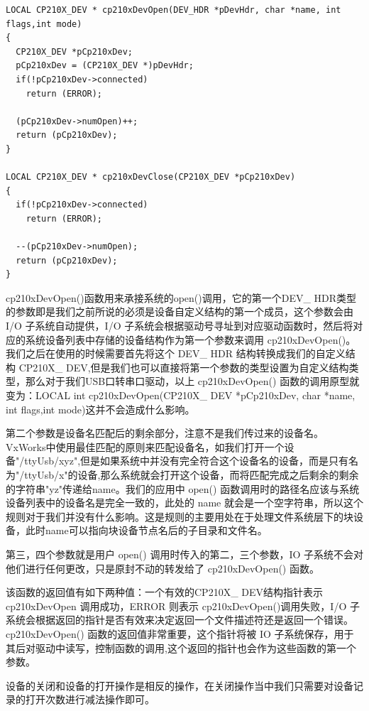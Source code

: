 \lstset{language=C}
\begin{lstlisting}
LOCAL CP210X_DEV * cp210xDevOpen(DEV_HDR *pDevHdr, char *name, int flags,int mode)
{
  CP210X_DEV *pCp210xDev;
  pCp210xDev = (CP210X_DEV *)pDevHdr;
  if(!pCp210xDev->connected)
    return (ERROR);
	
  (pCp210xDev->numOpen)++;
  return (pCp210xDev);
}

LOCAL CP210X_DEV * cp210xDevClose(CP210X_DEV *pCp210xDev)
{
  if(!pCp210xDev->connected)	
    return (ERROR);
	
  --(pCp210xDev->numOpen);
  return (pCp210xDev);
}

\end{lstlisting}

	cp210xDevOpen()函数用来承接系统的open()调用，它的第一个DEV\_ HDR类型的参数即是我们之前所说的必须是设备自定义结构的第一个成员，这个参数会由 I/O 子系统自动提供，I/O 子系统会根据驱动号寻址到对应驱动函数时，然后将对应的系统设备列表中存储的设备结构作为第一个参数来调用 cp210xDevOpen()。我们之后在使用的时候需要首先将这个 DEV\_ HDR 结构转换成我们的自定义结构 CP210X\_ DEV,但是我们也可以直接将第一个参数的类型设置为自定义结构类型，那么对于我们USB口转串口驱动，以上  cp210xDevOpen() 函数的调用原型就变为：LOCAL int cp210xDevOpen(CP210X\_ DEV *pCp210xDev, char *name, int flags,int mode)这并不会造成什么影响。
		
	第二个参数是设备名匹配后的剩余部分，注意不是我们传过来的设备名。VxWorks中使用最佳匹配的原则来匹配设备名，如我们打开一个设备"/ttyUsb/xyz",但是如果系统中并没有完全符合这个设备名的设备，而是只有名为"/ttyUsb/x"的设备,那么系统就会打开这个设备，而将匹配完成之后剩余的剩余的字符串"yz"传递给name。我们的应用中 open() 函数调用时的路径名应该与系统设备列表中的设备名是完全一致的，此处的 name 就会是一个空字符串，所以这个规则对于我们并没有什么影响。这是规则的主要用处在于处理文件系统层下的块设备，此时name可以指向块设备节点名后的子目录和文件名。

	第三，四个参数就是用户 open() 调用时传入的第二，三个参数，IO 子系统不会对他们进行任何更改，只是原封不动的转发给了 cp210xDevOpen() 函数。
	
	该函数的返回值有如下两种值：一个有效的CP210X\_ DEV结构指针表示 cp210xDevOpen 调用成功，ERROR 则表示 cp210xDevOpen()调用失败，I/O 子系统会根据返回的指针是否有效来决定返回一个文件描述符还是返回一个错误。cp210xDevOpen() 函数的返回值非常重要，这个指针将被 IO 子系统保存，用于其后对驱动中读写，控制函数的调用,这个返回的指针也会作为这些函数的第一个参数。
	
	设备的关闭和设备的打开操作是相反的操作，在关闭操作当中我们只需要对设备记录的打开次数进行减法操作即可。

